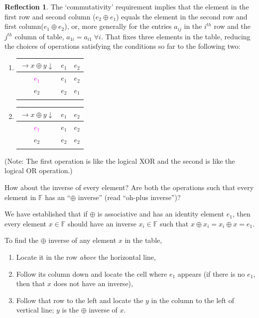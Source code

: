 \documentclass[english,notitlepage,smartquotes]{hgbreport}
\theoremstyle{definition}
\theoremstyle{definition}
\theoremstyle{remark}
\theoremstyle{definition}
\theoremstyle{plain}
\theoremstyle{definition}
\newtheorem{reflection}{Reflection}
\begin{document}
\begin{reflection}
The `commutativity' requirement implies that the element in the first row and second column ($e_2\oplus e_1$) equals the element in the second row and first column($e_1\oplus e_2$), or, more generally for the entries $a_{ij}$ in the $i^{th}$ row and the $j^{th}$ column of table, $a_{1i}=a_{i1}\;\forall i$. That fixes three elements in the table, reducing the choices of operations satisfying the conditions so far to the following two:
\begin{enumerate}
\item
\begin{tabular}{c|cc}
$\rightarrow x\oplus y\downarrow$ & $e_1$ & $e_2$\\
\hline
\textcolor{magenta}{$e_1$} & $e_1$ & $e_2$\\
$e_2$ & $e_2$ & $e_1$\\
\label{tab:abstractadd2-1}
\end{tabular}

\item
\begin{tabular}{c|cc}
$\rightarrow x\oplus y\downarrow$ & $e_1$ & $e_2$\\
\hline
\textcolor{magenta}{$e_1$} & $e_1$ & $e_2$\\
$e_2$ & $e_2$ & $e_2$\\
\label{tab:abstractadd2-2}
\end{tabular}
\end{enumerate}

(Note: The first operation is like the logical XOR and the second is like the logical OR operation.)

How about the inverse of every element? Are both the operations such that every element in $\mathbb{F}$ has an ``$\oplus$ inverse'' (read ``oh-plus inverse'')?

We have established that if $\oplus$ is associative and has an identity element $e_1$, then every element $x\in\mathbb{F}$ should have an inverse $x_i\in\mathbb{F}$ such that $x\oplus x_i=x_i\oplus x=e_1$.

To find the $\oplus$ inverse of any element $x$ in the table,
\begin{enumerate}
\item Locate it in the row \emph{above} the horizontal line,
\item Follow its column down and locate the cell where $e_1$ appears (if there is no $e_1$, then that $x$ does not have an inverse),
\item Follow that row to the left and locate the $y$ in the column to the left of vertical line; $y$ is the $\oplus$ inverse of $x$.
\end{enumerate}


\end{reflection}
\end{document}
